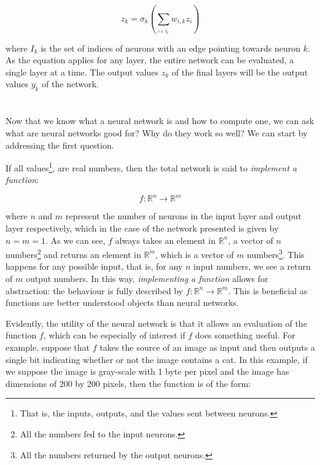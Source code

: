 \documentclass[11pt]{article}
\begin{document}
\begin{equation}z_{k} = \sigma_{k}\left(\sum_{_{i\in I_{k}}} w_{i,k}z_{i} \right)\nonumber\end{equation}

where $I_{k}$ is the set of indices of neurons with an edge pointing towards neuron $k$. As the equation applies for any layer, the entire network can be evaluated, a single layer at a time. The output values $z_{k}$ of the final layers will be the output values $y_{k}$ of the network.

\section{}

Now that we know what a neural network is and how to compute one, we can ask what are neural networks good for? Why do they work so well? We can start by addressing the first question.

If all values\footnote{That is, the inputs, outputs, and the values sent between neurons.}, are real numbers, then the total network is said to \textit{implement a function}:

\begin{equation}f: \mathbb{R}^{n} \rightarrow \mathbb{R}^{m}  \nonumber\end{equation}

where $n$ and $m$ represent the number of neurons in the input layer and output layer respectively, which in the case of the network presented is given by $n=m=1$. As we can see, $f$ always takes an element in $\mathbb{R}^{n}$, a vector of $n$ numbers\footnote{All the numbers fed to the input neurons.} and returns an element in  $\mathbb{R}^{m}$, which is a vector of $m$ numbers\footnote{All the numbers returned by the output neurons.}. This happens for any possible input, that is, for any $n$ input numbers, we see a return of $m$ output numbers. In this way, \textit{implementing a function} allows for abstraction: the behaviour is fully described by $f: \mathbb{R}^{n} \rightarrow \mathbb{R}^{m}$. This is beneficial as functions are better understood objects than neural networks.

	Evidently, the utility of the neural network is that it allows an evaluation of the function $f$, which can be especially of interest if $f$ does something useful. For example, suppose that $f$ takes the source of an image as input and then outputs a single bit indicating whether or not the image contains a cat. In this example, if we suppose the image is gray-scale with 1 byte per pixel and the image has dimensions of 200 by 200 pixels, then the function is of the form:
\end{document}
